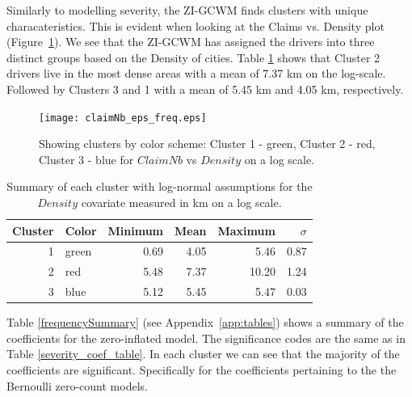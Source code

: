 \documentclass[12pt,letterpaper]{article}
\numberwithin{equation}{section}
\numberwithin{equation}{section}
\numberwithin{equation}{section}
\begin{document}
Similarly to modelling severity, the ZI-GCWM finds clusters with unique characateristics. This is evident when looking at the Claims vs. Density plot (Figure~\ref{frequencyGraph}). We see that the ZI-GCWM has assigned the drivers into three distinct groups based on the Density of cities. Table \ref{summarycovariates} shows that Cluster 2 drivers live in the most dense areas with a mean of 7.37 km on the log-scale. Followed by Clusters 3 and 1 with a mean of 5.45 km and 4.05 km, respectively.
\begin{figure}[!ht]
\begin{center}
\texttt{[image: claimNb\_eps\_freq.eps]}
\end{center}
\vspace{-0.2in}\caption{Showing clusters by color scheme: Cluster 1 - green, Cluster 2 - red, Cluster 3 - blue for $Claim Nb$ vs $Density$ on a log scale. }
\label{frequencyGraph}
\end{figure}
\begin{table}[!htb]
 \begin{center}
 \caption{Summary of each cluster with log-normal assumptions for the $Density$ covariate measured in km on a log scale.} \label{summarycovariates}
\begin{tabular}{rlrrrr}
\hline
Cluster  & Color & Minimum & Mean & Maximum & $\sigma$  \\
\hline
1       & green  & 0.69 & 4.05 & 5.46  & 0.87 \\
2       & red    & 5.48 & 7.37 & 10.20 & 1.24 \\
3       & blue   & 5.12 & 5.45 & 5.47  & 0.03 \\
\hline
\end{tabular}
\end{center}
\end{table}

Table \ref{frequencySummary} (see Appendix~\ref{app:tables}) shows a summary of the coefficients for the zero-inflated model. The
significance codes are the same as in Table \ref{severity_coef_table}. In each cluster we can see that the majority of the coefficients are significant. Specifically for the coefficients pertaining to the the Bernoulli zero-count models. 
\end{document}

